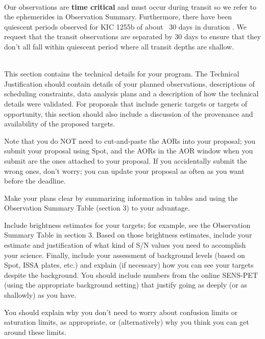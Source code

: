 \documentclass[letterpaper,12pt]{article}
\begin{document}
\\

Our observations are \textbf{time critical} and must occur during transit so we refer to the ephemerides in Observation Summary.
Furthermore, there have been quiescent periods observed for KIC 1255b of about ~30 days in duration \citep{vanWerkhoven2014}.
We request that the transit observations are separated by 30 days to ensure that they don't all fall within quiescent period where all transit depths are shallow.
\newline

\\

This section contains the technical details for your program. 
The Technical Justification should contain details of your planned observations, 
descriptions of scheduling constraints, data analysis plans and a 
description of how the technical details were validated. For proposals that 
include generic targets or targets of opportunity, this section should also 
include a discussion of the provenance and availability of the 
proposed targets.\newline

Note that you do NOT need to cut-and-paste the AORs into your
proposal; you submit your proposal using Spot, and the AORs in
the AOR window when you submit are the ones attached to your
proposal.  If you accidentally submit the wrong ones, don't worry;
you can update your proposal as often as you want before
the deadline.\newline

Make your plans clear by summarizing information in tables
and using the Observation Summary Table (section 3) to your advantage.\newline

Include brightness estimates 
for your targets; for example, see the Observation Summary Table
in section 3.  Based on those brightness estimates, include
your estimate and justification of what kind of S/N values you
need to accomplish your science.  Finally, include your
assessment of background levels (based on Spot, ISSA plates,
etc.) and explain (if necessary) how you can see your targets
despite the background. You should include numbers from the 
online SENS-PET (using the appropriate background setting) 
that justify going as deeply (or as shallowly) as you have.\newline

You should explain why you don't need to worry
about confusion limits or saturation limits, as appropriate, or
(alternatively) why you think you can get around these limits.\newline
\end{document}
